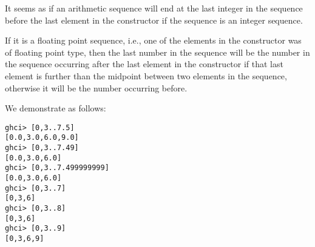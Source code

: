 
It seems as if an arithmetic sequence will end at the last 
integer in the sequence before the last element in the constructor if the 
sequence is an integer sequence.\par
\qquad If it is a floating point sequence, i.e., one of the elements in the 
constructor was of floating point type, then the last number in the sequence 
will be the number in the sequence occurring after the last element in the 
constructor if that last element is further than the midpoint between two 
elements in the sequence, otherwise it will be the number occurring before.\par
We demonstrate as follows:
\begin{verbatim}
ghci> [0,3..7.5]
[0.0,3.0,6.0,9.0]
ghci> [0,3..7.49]
[0.0,3.0,6.0]
ghci> [0,3..7.499999999]
[0.0,3.0,6.0]
ghci> [0,3..7]
[0,3,6]
ghci> [0,3..8]
[0,3,6]
ghci> [0,3..9]
[0,3,6,9]
\end{verbatim}
